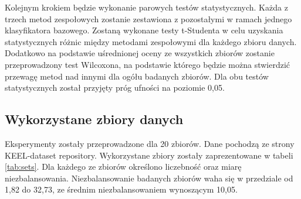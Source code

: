\documentclass[a4paper,12pt]{article}
\begin{document}
Kolejnym krokiem będzie wykonanie parowych testów statystycznych. Każda z trzech metod zespołowych zostanie zestawiona z pozostałymi w ramach jednego klasyfikatora bazowego. Zostaną wykonane testy t-Studenta w celu uzyskania statystycznych różnic między metodami zespołowymi dla każdego zbioru danych. Dodatkowo na podstawie uśrednionej oceny ze wszystkich zbiorów zostanie przeprowadzony test Wilcoxona, na podstawie którego będzie można stwierdzić przewagę metod nad innymi dla ogółu badanych zbiorów. Dla obu testów statystycznych został przyjęty próg ufności na poziomie 0,05.

\subsection{Wykorzystane zbiory danych}
Eksperymenty zostały przeprowadzone dla 20 zbiorów. Dane  pochodzą  ze  strony  KEEL-dataset repository\cite{keel}. Wykorzystane zbiory zostały zaprezentowane w tabeli \ref{tab:sets}. Dla każdego ze zbiorów określono liczebność oraz miarę niezbalansowania. Niezbalansowanie badanych zbiorów waha się w przedziale od 1,82 do 32,73, ze średnim niezbalansowaniem wynoszącym 10,05.
\end{document}
